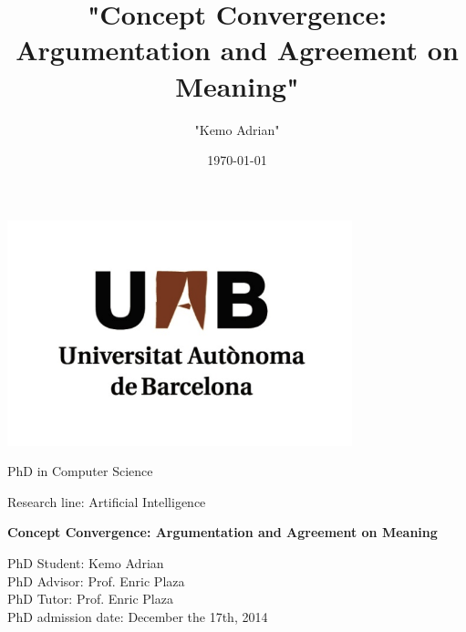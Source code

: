 \documentclass{report}
\title{"Concept Convergence: Argumentation and Agreement on Meaning"}
\author{"Kemo Adrian"}
\date{\today}
\begin{document}

\pagestyle{plain}
\thispagestyle{empty}


\begin{center}
  \includegraphics[width=10cm]{figs/UAB.png}
\end{center}


{\par
\centering 
{\LARGE PhD in Computer Science}
\par}

\vspace{2mm}

{\par
\centering 
{\Large Research line: Artificial Intelligence}
\par}


\vfill{}

\vspace{2mm}

{\par
\centering 
\textbf{\Huge  Concept Convergence: Argumentation and Agreement on Meaning }
\par}
\vfill{}

\begin{flushright}
PhD Student:    Kemo Adrian\\
PhD Advisor:    Prof. Enric Plaza\\  
PhD Tutor: Prof. Enric Plaza\\
PhD admission date: December the 17th, 2014
\end{flushright}

\vfill{}

\newpage
\end{document}
